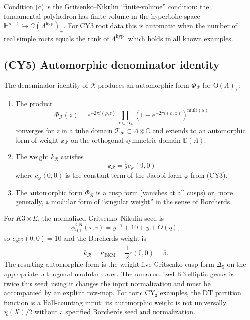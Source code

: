 \begin{remark}
\label{rem:cy4-gritsenko}
Condition (c) is the Gritsenko--Nikulin ``finite-volume'' condition: the fundamental polyhedron has finite volume in the hyperbolic space $\mathbb{H}^{s-1} \hookrightarrow C(\Lambda^{\mathrm{hyp}})_+$. For CY3 root data this is automatic when the number of real simple roots equals the rank of $\Lambda^{\mathrm{hyp}}$, which holds in all known examples.
\end{remark}

\subsection*{(CY5) Automorphic denominator identity}

The denominator identity of $\mathcal{R}$ produces an automorphic form $\Phi_\mathcal{R}$ for $\mathrm{O}(\Lambda)_+$:
\begin{enumerate}[label=(\alph*)]
 \item The product
 \[
 \Phi_\mathcal{R}(z) = e^{-2\pi i (\rho, z)} \prod_{\alpha \in \Delta_+} (1 - e^{-2\pi i (\alpha, z)})^{\mathrm{mult}(\alpha)}
 \]
 converges for $z$ in a tube domain $\mathcal{T}_\mathcal{R} \subset \Lambda \otimes \mathbb{C}$ and extends to an automorphic form of weight $k_\mathcal{R}$ on the orthogonal symmetric domain $\mathbb{D}(\Lambda)$.

 \item The weight $k_\mathcal{R}$ satisfies
 \[
 k_\mathcal{R} = \tfrac{1}{2} c_\varphi(0,0)
 \]
 where $c_\varphi(0,0)$ is the constant term of the Jacobi form $\varphi$ from (CY3).

 \item The automorphic form $\Phi_\mathcal{R}$ is a cusp form (vanishes at all cusps) or, more generally, a modular form of ``singular weight'' in the sense of Borcherds.
\end{enumerate}

\begin{remark}
\label{rem:cy5-igusa}
For $K3 \times E$, the normalized Gritsenko--Nikulin seed is
\[
 \phi_{0,1}^{\mathrm{GN}}(\tau,z)
 = y^{-1}+10+y+O(q),
\]
so $c_{\phi_{0,1}^{\mathrm{GN}}}(0,0)=10$ and the Borcherds weight is
\[
 k_{\mathcal R}=\kappa_{\mathrm{BKM}}=\frac12 c(0,0)=5.
\]
The resulting automorphic form is the weight-five Gritsenko cusp form
$\Delta_5$ on the appropriate orthogonal modular cover. The unnormalized
K3 elliptic genus is twice this seed; using it changes the input
normalization and must be accompanied by an explicit row-map. For toric
CY$_3$ examples, the DT partition function is a Hall-counting input; its
automorphic weight is not universally $\chi(X)/2$ without a specified
Borcherds seed and normalization.
\end{remark}

